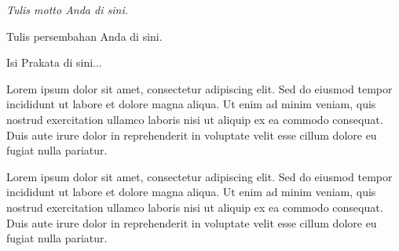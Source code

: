 \documentclass[skripsi,indonesia]{ugmskripsi}
\begin{document}
\cover
\titlepageind
\approvalpage
\declarepage
\motto
\textit{Tulis motto Anda di sini.}

\acknowledment
Tulis persembahan Anda di sini.

\preface
Isi Prakata di sini...

\tableofcontents
\clearpage
{}
{}
\listoftables
\clearpage
{}
{}
\listoffigures

\abstractind

Lorem ipsum dolor sit amet, consectetur adipiscing elit. Sed do eiusmod tempor incididunt ut labore et dolore magna aliqua. Ut enim ad minim veniam, quis nostrud exercitation ullamco laboris nisi ut aliquip ex ea commodo consequat. Duis aute irure dolor in reprehenderit in voluptate velit esse cillum dolore eu fugiat nulla pariatur.
\endabstractind

\abstracteng

Lorem ipsum dolor sit amet, consectetur adipiscing elit. Sed do eiusmod tempor incididunt ut labore et dolore magna aliqua. Ut enim ad minim veniam, quis nostrud exercitation ullamco laboris nisi ut aliquip ex ea commodo consequat. Duis aute irure dolor in reprehenderit in voluptate velit esse cillum dolore eu fugiat nulla pariatur.
\endabstracteng










\appendix

\end{document}
